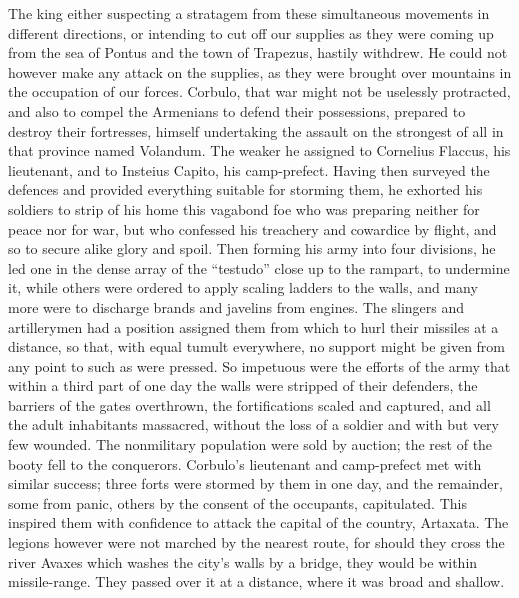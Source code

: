 The king either suspecting a stratagem from these simultaneous movements in different directions, or intending to cut off our supplies as they were coming up from the sea of Pontus and the town of Trapezus, hastily withdrew. He could not however make any attack on the supplies, as they were brought over mountains in the occupation of our forces. Corbulo, that war might not be uselessly protracted, and also to compel the Armenians to defend their possessions, prepared to destroy their fortresses, himself undertaking the assault on the strongest of all in that province named Volandum. The weaker he assigned to Cornelius Flaccus, his lieutenant, and to Insteius Capito, his camp-prefect. Having then surveyed the defences and provided everything suitable for storming them, he exhorted his soldiers to strip of his home this vagabond foe who was preparing neither for peace nor for war, but who confessed his treachery and cowardice by flight, and so to secure alike glory and spoil. Then forming his army into four divisions, he led one in the dense array of the ``testudo'' close up to the rampart, to undermine it, while others were ordered to apply scaling ladders to the walls, and many more were to discharge brands and javelins from engines. The slingers and artillerymen had a position assigned them from which to hurl their missiles at a distance, so that, with equal tumult everywhere, no support might be given from any point to such as were pressed. So impetuous were the efforts of the army that within a third part of one day the walls were stripped of their defenders, the barriers of the gates overthrown, the fortifications scaled and captured, and all the adult inhabitants massacred, without the loss of a soldier and with but very few wounded. The nonmilitary population were sold by auction; the rest of the booty fell to the conquerors. Corbulo's lieutenant and camp-prefect met with similar success; three forts were stormed by them in one day, and the remainder, some from panic, others by the consent of the occupants, capitulated. This inspired them with confidence to attack the capital of the country, Artaxata. The legions however were not marched by the nearest route, for should they cross the river Avaxes which washes the city's walls by a bridge, they would be within missile-range. They passed over it at a distance, where it was broad and shallow.


